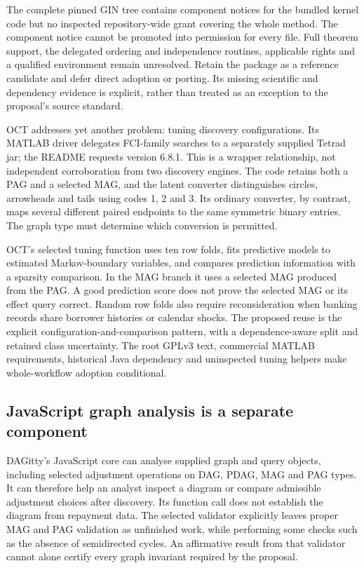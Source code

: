 The complete pinned GIN tree contains component notices for the bundled
kernel code but no inspected repository-wide grant covering the whole
method. The component notice cannot be promoted into permission for
every file. Full theorem support, the delegated ordering and
independence routines, applicable rights and a qualified environment
remain unresolved. Retain the package as a reference candidate and defer
direct adoption or porting. Its missing scientific and dependency
evidence is explicit, rather than treated as an exception to the
proposal's source standard. \citep{exec14_olatent_gin}

OCT addresses yet another problem: tuning discovery configurations. Its
MATLAB driver delegates FCI-family searches to a separately supplied
Tetrad jar; the README requests version 6.8.1. This is a wrapper
relationship, not independent corroboration from two discovery engines.
The code retains both a PAG and a selected MAG, and the latent converter
distinguishes circles, arrowheads and tails using codes 1, 2 and 3. Its
ordinary converter, by contrast, maps several different paired endpoints
to the same symmetric binary entries. The graph type must determine
which conversion is permitted. \citep{exec14_olatent_oct}

OCT's selected tuning function uses ten row folds, fits predictive
models to estimated Markov-boundary variables, and compares prediction
information with a sparsity comparison. In the MAG branch it uses a
selected MAG produced from the PAG. A good prediction score does not
prove the selected MAG or its effect query correct. Random row folds
also require reconsideration when banking records share borrower
histories or calendar shocks. The proposed reuse is the explicit
configuration-and-comparison pattern, with a dependence-aware split and
retained class uncertainty. The root GPLv3 text, commercial MATLAB
requirements, historical Java dependency and uninspected tuning helpers
make whole-workflow adoption conditional. \citep{exec14_olatent_oct}

\hypertarget{javascript-graph-analysis-is-a-separate-component}{%
\subsection{JavaScript graph analysis is a separate
component}\label{javascript-graph-analysis-is-a-separate-component}}

DAGitty's JavaScript core can analyse supplied graph and query objects,
including selected adjustment operations on DAG, PDAG, MAG and PAG
types. It can therefore help an analyst inspect a diagram or compare
admissible adjustment choices after discovery. Its function call does
not establish the diagram from repayment data. The selected validator
explicitly leaves proper MAG and PAG validation as unfinished work,
while performing some checks such as the absence of semidirected cycles.
An affirmative result from that validator cannot alone certify every
graph invariant required by the proposal. \citep{exec14_olatent_dagitty}

